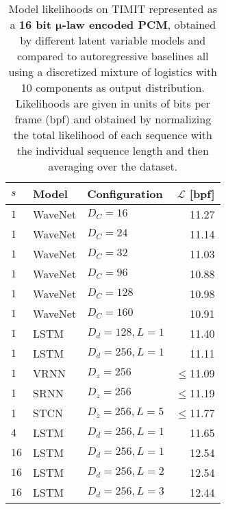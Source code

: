 {\begin{table}[p]
    \caption{
    Model likelihoods on TIMIT represented as a \textbf{16 bit $\boldsymbol{\mu}$-law encoded PCM}, obtained by different latent variable models and compared to autoregressive baselines all using a discretized mixture of logistics with 10 components as output distribution. Likelihoods are given in units of bits per frame (bpf) and obtained by normalizing the total likelihood of each sequence with the individual sequence length and then averaging over the dataset.
    }
    \centering
    \begin{tabular}{lll|r}
        \toprule
        $s$    & \bf Model           & \bf Configuration           & \bf $\mathcal{L}$ [bpf] \\
        \midrule
        $1$       & WaveNet             & $D_C=16$              & 11.27 \\
        $1$       & WaveNet             & $D_C=24$              & 11.14 \\
        $1$       & WaveNet             & $D_C=32$              & 11.03 \\
        $1$       & WaveNet             & $D_C=96$              & 10.88 \\
        $1$       & WaveNet             & $D_C=128$             & 10.98 \\
        $1$       & WaveNet             & $D_C=160$             & 10.91 \\
        $1$       & LSTM                & $D_d=128, L=1$        & 11.40 \\
        $1$       & LSTM                & $D_d=256, L=1$        & 11.11 \\
        $1$       & VRNN                & $D_z=256$             & $\leq$11.09 \\
        $1$       & SRNN                & $D_z=256$             & $\leq$11.19 \\
        1 & STCN                & $D_z=256,L=5$               & $\leq$11.77 \\  %
        \midrule
        $4$       & LSTM                & $D_d=256, L=1$        & 11.65 \\
        \midrule
        $16$      & LSTM                & $D_d=256, L=1$        & 12.54 \\
        $16$      & LSTM                & $D_d=256, L=2$        & 12.54 \\
        $16$      & LSTM                & $D_d=256, L=3$        & 12.44 \\
        \midrule

\end{tabular}
\end{table}}
